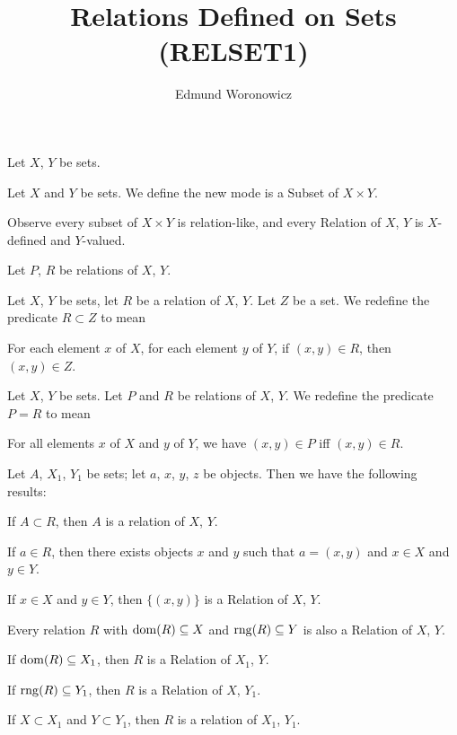 \documentclass{article}
\title{Relations Defined on Sets (RELSET1)}
\author{Edmund Woronowicz}
\begin{document}
\maketitle

Let $X$, $Y$ be sets.

\begin{definition}
Let $X$ and $Y$ be sets. We define the new mode 
is a Subset of $X\times Y$.
\end{definition}

Observe every subset of $X\times Y$ is relation-like, and every Relation
of $X$, $Y$ is $X$-defined and $Y$-valued.

Let $P$, $R$ be relations of $X$, $Y$.

\begin{definition}
Let $X$, $Y$ be sets, let $R$ be a relation of $X$, $Y$. Let $Z$ be a set.
We redefine the predicate $R\subset Z$ to mean
\begin{defn}
\item For each element $x$ of $X$, for each element $y$ of $Y$, if
  $(x,y)\in R$, then $(x,y)\in Z$.
\end{defn}
\end{definition}

\begin{definition}
Let $X$, $Y$ be sets. Let $P$ and $R$ be relations of $X$, $Y$.
We redefine the predicate $P=R$ to mean
\begin{defn}
\item For all elements $x$ of $X$ and $y$ of $Y$, we have $(x,y)\in P$
  iff $(x,y)\in R$.
\end{defn}
\end{definition}


Let $A$, $X_{1}$, $Y_{1}$ be sets; let $a$, $x$, $y$, $z$ be objects. Then we have the following results:
\begin{thm}
\item\label{relset1:1} If $A\subset R$, then $A$ is a relation of $X$, $Y$.
\item\label{relset1:2} If $a\in R$, then there exists objects $x$ and
  $y$ such that $a=(x,y)$ and $x\in X$ and $y\in Y$.
\item\label{relset1:3} If $x\in X$ and $y\in Y$, then $\{(x,y)\}$ is a
  Relation of $X$, $Y$.
\item\label{relset1:4} Every relation $R$ with $\operatorname{dom}(R)\subseteq X$ and
  $\operatorname{rng}(R)\subseteq Y$ is also a Relation of $X$, $Y$.
\item\label{relset1:5} If $\operatorname{dom}(R)\subseteq X_{1}$, then $R$ is a Relation
  of $X_{1}$, $Y$.
\item\label{relset1:6} If $\operatorname{rng}(R)\subseteq Y_{1}$, then $R$ is a Relation
  of $X$, $Y_{1}$.
\item\label{relset1:7} If $X\subset X_{1}$ and $Y\subset Y_{1}$, then
  $R$ is a relation of $X_{1}$, $Y_{1}$.
\end{thm}
\end{document}
